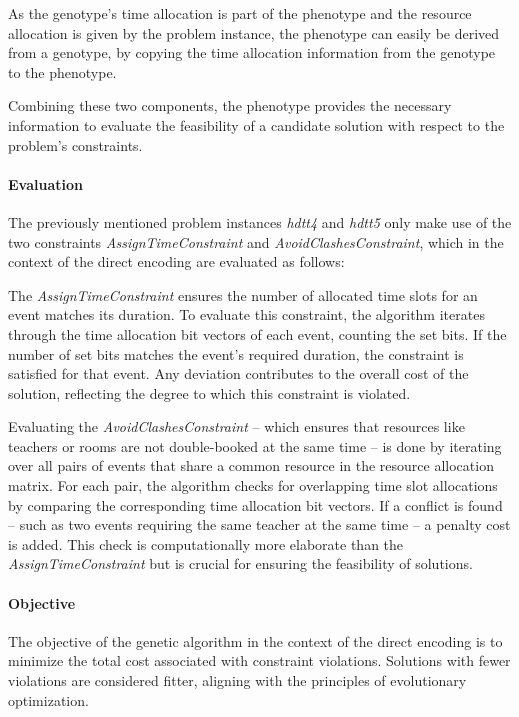 \documentclass[english,examples]{isasthesis}
\begin{document}
As the genotype's time allocation is part of the phenotype and the resource
allocation is given by the problem instance, the phenotype
can easily be derived from a genotype, by copying the time allocation
information from the genotype to the phenotype.

Combining these two components, the phenotype provides the necessary
information to evaluate the feasibility of a candidate solution with respect to
the problem's constraints.

\paragraph{Evaluation}
The previously mentioned problem instances \textit{hdtt4} and \textit{hdtt5}
only make use of the two constraints \textit{AssignTimeConstraint} and
\textit{AvoidClashesConstraint}, which in the context of the direct encoding
are evaluated as follows:

The \textit{AssignTimeConstraint} ensures the number of allocated time slots
for an event matches its duration. To evaluate this constraint, the
algorithm iterates through the time allocation bit vectors of each event,
counting the set bits. If the number of set bits matches the event's required
duration, the constraint is satisfied for that event. Any deviation contributes
to the overall cost of the solution, reflecting the degree to which this
constraint is violated.

Evaluating the \textit{AvoidClashesConstraint} -- which ensures that resources
like teachers or rooms are not double-booked at the same time -- is done by
iterating over all pairs of events that share a common resource in the
resource allocation matrix. For each pair, the algorithm checks for overlapping
time slot allocations by comparing the corresponding time allocation bit
vectors. If a conflict is found -- such as two events requiring the same teacher
at the same time -- a penalty cost is added. This check is computationally more
elaborate than the \textit{AssignTimeConstraint} but is crucial for ensuring
the feasibility of solutions.

\paragraph{Objective}
The objective of the genetic algorithm in the context of the direct encoding
is to minimize the total cost associated with constraint violations. Solutions
with fewer violations are considered fitter, aligning with the principles of
evolutionary optimization.
\end{document}
